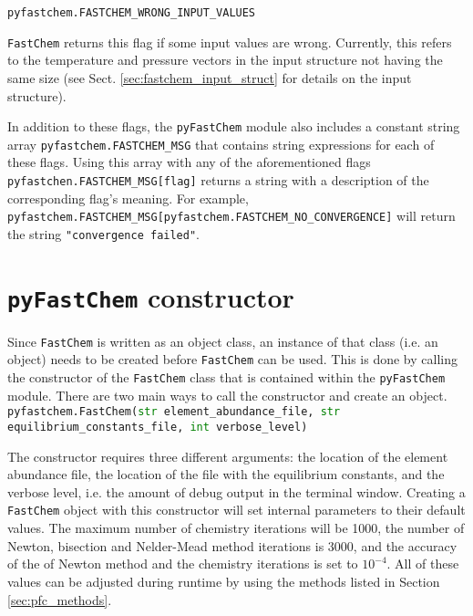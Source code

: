\documentclass[numbers=noenddot]{aux/fcmanual}
\newcommand{\fc}{\texttt{FastChem}\xspace}
\newcommand{\pfc}{\texttt{pyFastChem}\xspace}
\begin{document}
\bigbreak
        
\lstinline!pyfastchem.FASTCHEM_WRONG_INPUT_VALUES!
\begin{addmargin}[25pt]{0pt}
  \fc returns this flag if some input values are wrong. Currently, this refers to the temperature and pressure vectors in the input structure not having the same size (see Sect. \ref{sec:fastchem_input_struct} for details on the input structure).
\end{addmargin}

\bigbreak
          
In addition to these flags, the \pfc module also includes a constant string array \lstinline!pyfastchem.FASTCHEM_MSG! that contains string expressions for each of these flags. Using this array with any of the aforementioned flags \lstinline!pyfastchen.FASTCHEM_MSG[flag]! returns a string with a description of the corresponding flag's meaning. For example, \lstinline!pyfastchem.FASTCHEM_MSG[pyfastchem.FASTCHEM_NO_CONVERGENCE]! will return the string \lstinline!"convergence failed"!.


\section{\pfc constructor}

Since \fc is written as an object class, an instance of that class (i.e. an object) needs to be created before \fc can be used. This is done by calling the constructor of the \fc class that is contained within the \pfc module. There are two main ways to call the constructor and create an object.\\


\lstinline[language=Python, breaklines=true]!pyfastchem.FastChem(str element_abundance_file, str equilibrium_constants_file, int verbose_level)!
\begin{addmargin}[25pt]{0pt}
	The constructor requires three different arguments: the location of the element abundance file, the location of the file with the equilibrium constants, and the verbose level, i.e. the amount of debug output in the terminal window. Creating a \fc object with this constructor will set internal parameters to their default values. The maximum number of chemistry iterations will be 1000, the number of Newton, bisection and Nelder-Mead method iterations is 3000, and the accuracy of the of Newton method and the chemistry iterations is set to $10^{-4}$. All of these values can be adjusted during runtime by using the methods listed in Section \ref{sec:pfc_methods}.
\end{addmargin}
\end{document}
